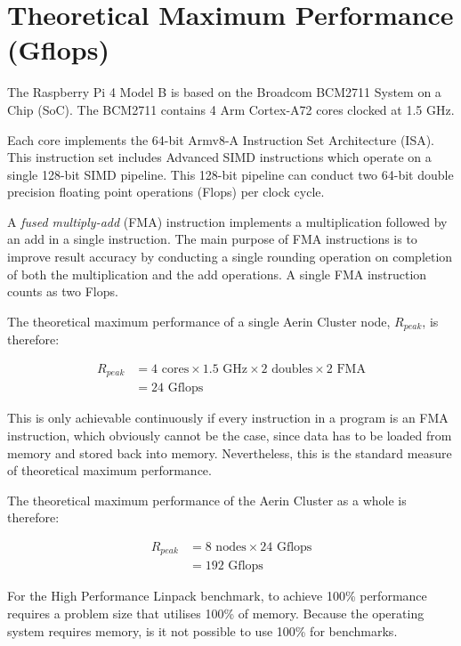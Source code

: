 \documentclass{report}
\begin{document}
%
%
\section{Theoretical Maximum Performance (Gflops)}

The Raspberry Pi 4 Model B is based on the Broadcom BCM2711 System on a Chip (SoC). The BCM2711 contains 4 Arm Cortex-A72 cores clocked at 1.5 GHz.

Each core implements the 64-bit Armv8-A Instruction Set Architecture (ISA). This instruction set includes Advanced SIMD instructions which operate on a single 128-bit SIMD pipeline. This 128-bit pipeline can conduct two 64-bit double precision floating point operations (Flops) per clock cycle.  

A \emph{fused multiply-add} (FMA) instruction implements a multiplication followed by an add in a single instruction. The main purpose of FMA instructions is to improve result accuracy by conducting a single rounding operation on completion of both the multiplication and the add operations. A single FMA instruction counts as two Flops. 

The theoretical maximum performance of a single Aerin Cluster node, $R_{peak}$, is therefore:

\begin{align}
R_{peak} &= 4 \textrm{ cores} \times 1.5 \textrm{ GHz} \times 2 \textrm{ doubles} \times 2 \textrm{ FMA}\\
&= 24 \textrm{ Gflops}
\end{align}

This is only achievable continuously if every instruction in a program is an FMA instruction, which obviously cannot be the case, since data has to be loaded from memory and stored back into memory. Nevertheless, this is the standard measure of theoretical maximum performance.

The theoretical maximum performance of the Aerin Cluster as a whole is therefore:

\begin{align}
R_{peak} &= 8 \textrm{ nodes} \times 24 \textrm{ Gflops}\\
&= 192 \textrm{ Gflops}
\end{align}

For the High Performance Linpack benchmark, to achieve 100\% performance requires a problem size that utilises 100\% of memory. Because the operating system requires memory, is it not possible to use 100\% for benchmarks.
\end{document}
